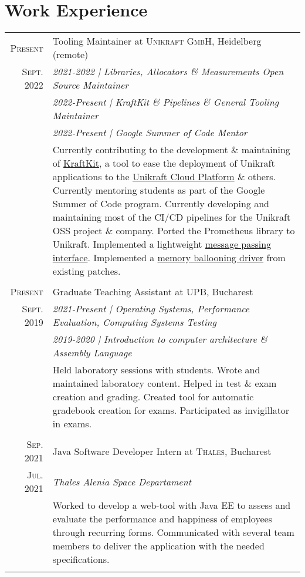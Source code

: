 \documentclass[a4paper,10pt]{article}
\begin{document}
\section{Work Experience}
\begin{tabular}{r|p{15cm}}
	\textsc{Present} & Tooling Maintainer at \textsc{Unikraft GmbH}, Heidelberg (remote) \\
	\textsc{Sept. 2022} & \emph{2021-2022 | Libraries, Allocators \& Measurements Open Source Maintainer} \\&
	\emph{2022-Present | KraftKit \& Pipelines \& General Tooling Maintainer} \\&
	\emph{2022-Present | Google Summer of Code Mentor} \\&
	\footnotesize
	{
		Currently contributing to the development \& maintaining of \href{https://github.com/unikraft/kraftkit/}{KraftKit}, a tool to ease the deployment of Unikraft applications to the \href{https://unikraft.cloud/}{Unikraft Cloud Platform} \& others.
		Currently mentoring students as part of the Google Summer of Code program.
		Currently developing and maintaining most of the CI/CD pipelines for the Unikraft OSS project \& company.
		Ported the Prometheus library to Unikraft.
		Implemented a lightweight \href{https://github.com/unikraft/unikraft/pull/202}{message passing interface}.
		Implemented a \href{https://github.com/unikraft/unikraft/pull/219}{memory ballooning driver} from existing patches.
	} \\
	\multicolumn{2}{c}{} \\

	\textsc{Present} & Graduate Teaching Assistant at \textsc{UPB}, Bucharest \\
	\textsc{Sept. 2019} & \emph{2021-Present | Operating Systems, Performance Evaluation, Computing Systems Testing} \\&
	\emph{2019-2020 | Introduction to computer architecture \& Assembly Language} \\&
	\footnotesize
	{
		Held laboratory sessions with students.
		Wrote and maintained laboratory content.
		Helped in test \& exam creation and grading.
		Created tool for automatic gradebook creation for exams.
		Participated as invigillator in exams.
	} \\
	\multicolumn{2}{c}{} \\

	\textsc{Sep. 2021} & Java Software Developer Intern at \textsc{Thales}, Bucharest \\
	\textsc{Jul. 2021} & \emph{Thales Alenia Space Departament}\\&
	\footnotesize
	{
		Worked to develop a web-tool with Java EE to assess and evaluate
		the performance and happiness of employees through recurring forms.
		Communicated with several team members to deliver the application
		with the needed specifications.
	} \\
	\multicolumn{2}{c}{} \\


\end{tabular}
\end{document}
